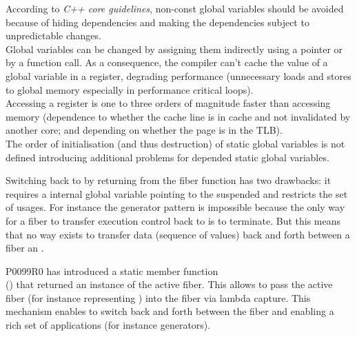 \label{problem_gpub}

According to \emph{C++ core guidelines}\cite{coreguidlines}, non-const global
variables should be avoided because of hiding dependencies and making the
dependencies subject to unpredictable changes.\\
Global variables can be changed by assigning them indirectly using a pointer or
by a function call. As a consequence, the compiler can't cache the value of a
global variable in a register, degrading performance (unnecessary
loads and stores to global memory especially in performance critical loops).\\
Accessing a register is one to three orders of magnitude faster than accessing
memory (dependence to whether the cache line is in cache and not invalidated by
another core; and depending on whether the page is in the TLB).\\
The order of initialisation (and thus destruction) of static global
variables is not defined introducing additional problems for depended static
global variables.\\


Switching back to \main by returning from the fiber function has two drawbacks:
it requires a internal global variable pointing to the suspended \main and
restricts the set of usages.
For instance the generator pattern is impossible because the only way
for a fiber to transfer execution control back to \main is to terminate. But
this means that no way exists to transfer data (sequence of values) back and
forth between a fiber an \main.\\


P0099R0\cite{P0099R0} has introduced a static member function\\
() that returned an instance of the active
fiber. This allows to pass the active fiber  (for instance representing
\main) into the fiber  via lambda capture. This mechanism enables to
switch back and forth between the fiber and \main enabling a rich set of
applications (for instance generators).

